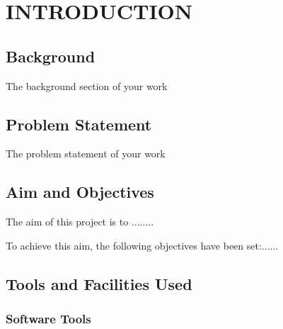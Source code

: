
\chapter{INTRODUCTION}

\ifpdf
	\graphicspath{{introduction/figures/PNG}{introduction/figures/PDF}{introduction/figures}}
\else
	\graphicspath{{introduction/figures/EPS}{introduction/figures}}
\fi

\section{Background}
The background section of your work

\section{Problem Statement}
The problem statement of your work

\section{Aim and Objectives}

The aim of this project is to ........

To achieve this aim, the following objectives have been set:......

\section{Tools and Facilities Used}

\subsection{Software Tools}

